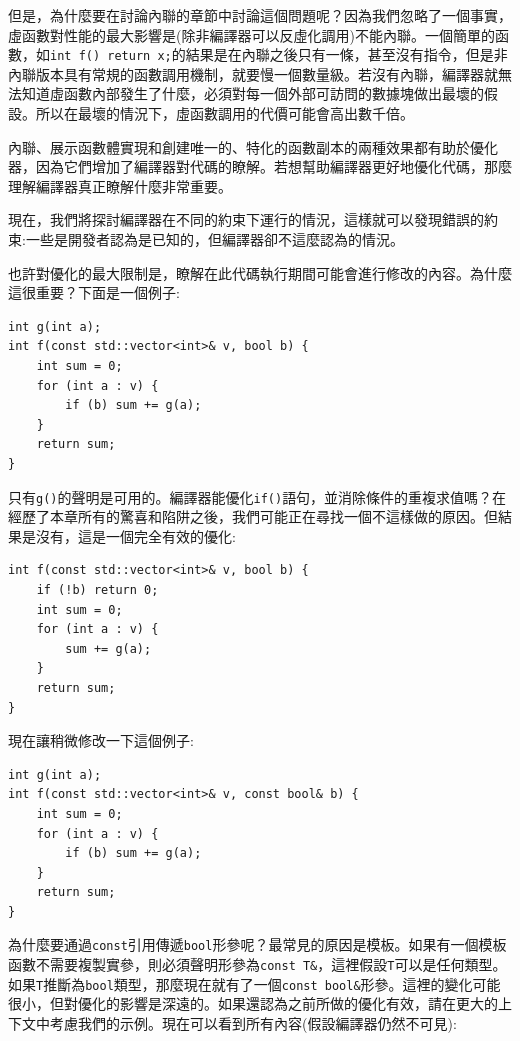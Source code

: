 但是，為什麼要在討論內聯的章節中討論這個問題呢？因為我們忽略了一個事實，虛函數對性能的最大影響是(除非編譯器可以反虛化調用)不能內聯。一個簡單的函數，如\texttt{int f() {return x;}}的結果是在內聯之後只有一條，甚至沒有指令，但是非內聯版本具有常規的函數調用機制，就要慢一個數量級。若沒有內聯，編譯器就無法知道虛函數內部發生了什麼，必須對每一個外部可訪問的數據塊做出最壞的假設。所以在最壞的情況下，虛函數調用的代價可能會高出數千倍。

內聯、展示函數體實現和創建唯一的、特化的函數副本的兩種效果都有助於優化器，因為它們增加了編譯器對代碼的瞭解。若想幫助編譯器更好地優化代碼，那麼理解編譯器真正瞭解什麼非常重要。 

現在，我們將探討編譯器在不同的約束下運行的情況，這樣就可以發現錯誤的約束:一些是開發者認為是已知的，但編譯器卻不這麼認為的情況。 


也許對優化的最大限制是，瞭解在此代碼執行期間可能會進行修改的內容。為什麼這很重要？下面是一個例子:

\begin{lstlisting}[style=styleCXX]
int g(int a);
int f(const std::vector<int>& v, bool b) {
	int sum = 0;
	for (int a : v) {
		if (b) sum += g(a);
	}
	return sum;
} 
\end{lstlisting}

只有\texttt{g()}的聲明是可用的。編譯器能優化\texttt{if()}語句，並消除條件的重複求值嗎？在經歷了本章所有的驚喜和陷阱之後，我們可能正在尋找一個不這樣做的原因。但結果是沒有，這是一個完全有效的優化:

\begin{lstlisting}[style=styleCXX]
int f(const std::vector<int>& v, bool b) {
	if (!b) return 0;
	int sum = 0;
	for (int a : v) {
		sum += g(a);
	}
	return sum;
} 

\end{lstlisting}

現在讓稍微修改一下這個例子:

\begin{lstlisting}[style=styleCXX]
int g(int a);
int f(const std::vector<int>& v, const bool& b) {
	int sum = 0;
	for (int a : v) {
		if (b) sum += g(a);
	}
	return sum;
} 
\end{lstlisting}

為什麼要通過\texttt{const}引用傳遞\texttt{bool}形參呢？最常見的原因是模板。如果有一個模板函數不需要複製實參，則必須聲明形參為\texttt{const T\&}，這裡假設\texttt{T}可以是任何類型。如果\texttt{T}推斷為\texttt{bool}類型，那麼現在就有了一個\texttt{const bool\&}形參。這裡的變化可能很小，但對優化的影響是深遠的。如果還認為之前所做的優化有效，請在更大的上下文中考慮我們的示例。現在可以看到所有內容(假設編譯器仍然不可見):

